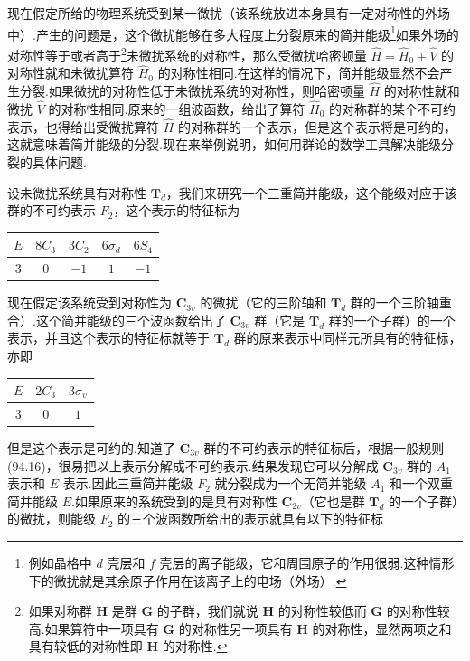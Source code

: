 现在假定所给的物理系统受到某一微扰（该系统放进本身具有一定对称性的外场中）.产生的问题是，这个微扰能够在多大程度上分裂原来的简并能级\footnote{例如晶格中 $d$ 壳层和 $f$ 壳层的离子能级，它和周围原子的作用很弱.这种情形下的微扰就是其余原子作用在该离子上的电场（外场）.}如果外场的对称性等于或者高于\footnote{如果对称群 $\boldsymbol{H}$ 是群 $\boldsymbol{G}$ 的子群，我们就说 $\boldsymbol{H}$ 的对称性较低而 $\boldsymbol{G}$ 的对称性较高.如果算符中一项具有 $\boldsymbol{G}$ 的对称性另一项具有 $\boldsymbol{H}$ 的对称性，显然两项之和具有较低的对称性即 $\boldsymbol{H}$ 的对称性.}未微扰系统的对称性，那么受微扰哈密顿量 $\hat{H}=\hat{H}_0+\hat{V}$ 的对称性就和未微扰算符 $\hat{H}_0$ 的对称性相同.在这样的情况下，简并能级显然不会产生分裂.如果微扰的对称性低于未微扰系统的对称性，则哈密顿量 $\hat{H}$ 的对称性就和微扰 $\hat{V}$ 的对称性相同.原来的一组波函数，给出了算符 $\hat{H}_0$ 的对称群的某个不可约表示，也得给出受微扰算符 $\hat{H}$ 的对称群的一个表示，但是这个表示将是可约的，这就意味着简并能级的分裂.现在来举例说明，如何用群论的数学工具解决能级分裂的具体问题.

设未微扰系统具有对称性 $\boldsymbol{T}_d$，我们来研究一个三重简并能级，这个能级对应于该群的不可约表示 $F_2$，这个表示的特征标为

\begin{center}
\begin{tabular}{ccccc}
  $E$ & $8C_3$ & $3C_2$ & $6\sigma_d$ & $6S_4$\\
  \hline
  $3$ & $0$ & $-1$ & $1$ & $-1$\\
\end{tabular}
\end{center}

\noindent 现在假定该系统受到对称性为 $\boldsymbol{C}_{3v}$ 的微扰（它的三阶轴和 $\boldsymbol{T}_d$ 群的一个三阶轴重合）.这个简并能级的三个波函数给出了 $\boldsymbol{C}_{3v}$ 群（它是 $\boldsymbol{T}_d$ 群的一个子群）的一个表示，并且这个表示的特征标就等于 $\boldsymbol{T}_d$ 群的原来表示中同样元所具有的特征标，亦即

\begin{center}
\begin{tabular}{ccc}
  $E$ & $2C_3$ & $3\sigma_v$\\
  \hline
  $3$ & $0$ & $1$\\
\end{tabular}
\end{center}

\noindent 但是这个表示是可约的.知道了 $\boldsymbol{C}_{3v}$ 群的不可约表示的特征标后，根据一般规则 (94.16)，很易把以上表示分解成不可约表示.结果发现它可以分解成 $\boldsymbol{C}_{3v}$ 群的 $A_1$ 表示和 $E$ 表示.因此三重简并能级 $F_2$ 就分裂成为一个无简并能级 $A_1$ 和一个双重简并能级 $E$.如果原来的系统受到的是具有对称性 $\boldsymbol{C}_{2v}$（它也是群 $\boldsymbol{T}_d$ 的一个子群）的微扰，则能级 $F_2$ 的三个波函数所给出的表示就具有以下的特征标

